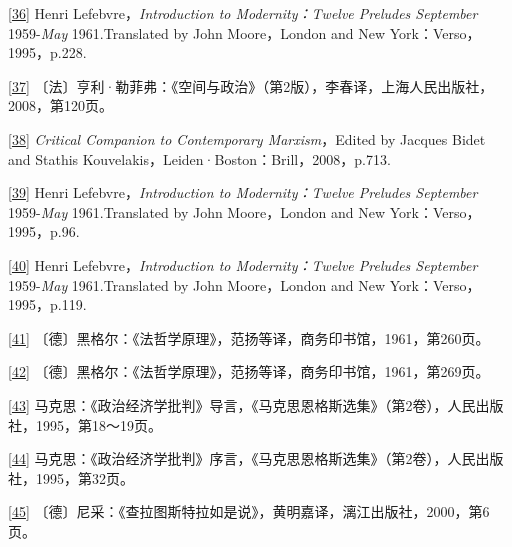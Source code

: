 \documentclass[UTF8, fontset = sourcesans, a4paper, oneside, zihao =
-4, scheme=chinese, no-math, space=true]{ctexbook}
\begin{document}
\protect\hypertarget{part0005_split_003.htmlux5cux23m36}{}{}\protect\hyperlink{part0005_split_002.htmlux5cux23w36}{{[}36{]}}
Henri Lefebvre，\emph{Introduction to Modernity：Twelve Preludes
September} 1959-\emph{May} 1961.Translated by John Moore，London and New
York：Verso，1995，p.228.

\protect\hypertarget{part0005_split_003.htmlux5cux23m37}{}{}\protect\hyperlink{part0005_split_002.htmlux5cux23w37}{{[}37{]}}
〔法〕亨利·勒菲弗：《空间与政治》（第2版），李春译，上海人民出版社，2008，第120页。

\protect\hypertarget{part0005_split_003.htmlux5cux23m38}{}{}\protect\hyperlink{part0005_split_002.htmlux5cux23w38}{{[}38{]}}
\emph{Critical Companion to Contemporary Marxism}，Edited by Jacques
Bidet and Stathis Kouvelakis，Leiden·Boston：Brill，2008，p.713.

\protect\hypertarget{part0005_split_003.htmlux5cux23m39}{}{}\protect\hyperlink{part0005_split_002.htmlux5cux23w39}{{[}39{]}}
Henri Lefebvre，\emph{Introduction to Modernity：Twelve Preludes
September} 1959-\emph{May} 1961.Translated by John Moore，London and New
York：Verso，1995，p.96.

\protect\hypertarget{part0005_split_003.htmlux5cux23m40}{}{}\protect\hyperlink{part0005_split_002.htmlux5cux23w40}{{[}40{]}}
Henri Lefebvre，\emph{Introduction to Modernity：Twelve Preludes
September} 1959-\emph{May} 1961.Translated by John Moore，London and New
York：Verso，1995，p.119.

\protect\hypertarget{part0005_split_003.htmlux5cux23m41}{}{}\protect\hyperlink{part0005_split_003.htmlux5cux23w41}{{[}41{]}}
〔德〕黑格尔：《法哲学原理》，范扬等译，商务印书馆，1961，第260页。

\protect\hypertarget{part0005_split_003.htmlux5cux23m42}{}{}\protect\hyperlink{part0005_split_003.htmlux5cux23w42}{{[}42{]}}
〔德〕黑格尔：《法哲学原理》，范扬等译，商务印书馆，1961，第269页。

\protect\hypertarget{part0005_split_003.htmlux5cux23m43}{}{}\protect\hyperlink{part0005_split_003.htmlux5cux23w43}{{[}43{]}}
马克思：《政治经济学批判》导言，《马克思恩格斯选集》（第2卷），人民出版社，1995，第18～19页。

\protect\hypertarget{part0005_split_003.htmlux5cux23m44}{}{}\protect\hyperlink{part0005_split_003.htmlux5cux23w44}{{[}44{]}}
马克思：《政治经济学批判》序言，《马克思恩格斯选集》（第2卷），人民出版社，1995，第32页。

\protect\hypertarget{part0005_split_003.htmlux5cux23m45}{}{}\protect\hyperlink{part0005_split_003.htmlux5cux23w45}{{[}45{]}}
〔德〕尼采：《查拉图斯特拉如是说》，黄明嘉译，漓江出版社，2000，第6页。
\end{document}
